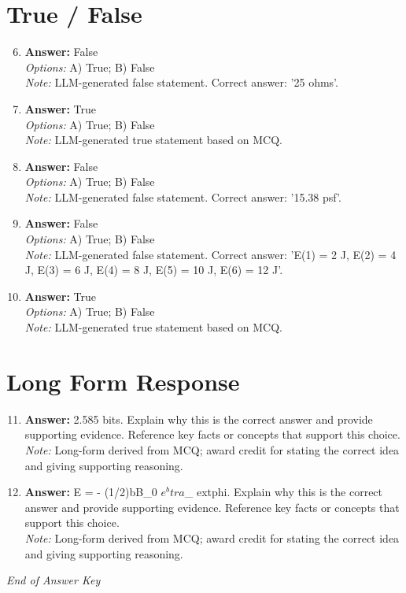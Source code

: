 \documentclass[12pt]{article}
\begin{document}
\section*{True / False}
\begin{enumerate}[label=\arabic*.]
\setcounter{enumi}{5}
\item \textbf{Answer:} False
\\ \textit{Options:} A) True; B) False
\\ \textit{Note:} LLM-generated false statement. Correct answer: '25 ohms'.
\item \textbf{Answer:} True
\\ \textit{Options:} A) True; B) False
\\ \textit{Note:} LLM-generated true statement based on MCQ.
\item \textbf{Answer:} False
\\ \textit{Options:} A) True; B) False
\\ \textit{Note:} LLM-generated false statement. Correct answer: '15.38 psf'.
\item \textbf{Answer:} False
\\ \textit{Options:} A) True; B) False
\\ \textit{Note:} LLM-generated false statement. Correct answer: 'E(1) = 2 J, E(2) = 4 J, E(3) = 6 J, E(4) = 8 J, E(5) = 10 J, E(6) = 12 J'.
\item \textbf{Answer:} True
\\ \textit{Options:} A) True; B) False
\\ \textit{Note:} LLM-generated true statement based on MCQ.
\end{enumerate}

\section*{Long Form Response}
\begin{enumerate}[label=\arabic*.]
\setcounter{enumi}{10}
\item \textbf{Answer:} 2.585 bits. Explain why this is the correct answer and provide supporting evidence. Reference key facts or concepts that support this choice.
\\ \textit{Note:} Long-form derived from MCQ; award credit for stating the correct idea and giving supporting reasoning.
\item \textbf{Answer:} E = - (1/2)bB\_0 $e^btra$\_ extphi. Explain why this is the correct answer and provide supporting evidence. Reference key facts or concepts that support this choice.
\\ \textit{Note:} Long-form derived from MCQ; award credit for stating the correct idea and giving supporting reasoning.
\end{enumerate}

\vfill
\noindent\textit{End of Answer Key}
\end{document}
